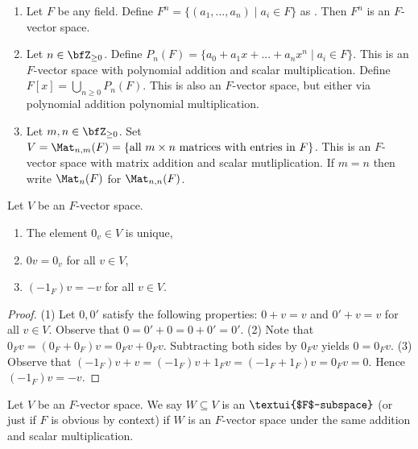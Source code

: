     \begin{example}
        \phantom{a}
        \begin{enumerate}[label = (\arabic*)]
            \item Let $F$ be any field. Define $F^n = \{(a_1,...,a_n) \mid a_i \in F\}$ as . Then $F^n$ is an $F$-vector space.
            \item Let $n \in \bfZ_{\geq 0}$. Define $P_n(F) = \{a_0 + a_1 x + ... + a_n x^n \mid a_i \in F\}$. This is an $F$-vector space with polynomial addition and scalar multiplication. Define $F[x] = \bigcup_{n \geq 0} P_n(F)$. This is also an $F$-vector space, but either via polynomial addition  polynomial multiplication.
            \item Let $m,n \in \bfZ_{\geq 0}$. Set $V = \Mat_{n,m}{(F)} = \{\text{all $m \times n$ matrices with entries in $F$}\}$. This is an $F$-vector space with matrix addition and scalar mutliplication. If $m = n$ then write $\Mat_{n}{(F)}$ for $\Mat_{n,n}{(F)}$.
        \end{enumerate}
    \end{example}

    \begin{lemma}
        Let $V$ be an $F$-vector space.
        \begin{enumerate}
            \item The element $0_v \in V$ is unique,
            \item $0v = 0_v$ for all $v \in V$,
            \item $(-1_F)v = -v$ for all $v \in V$.
        \end{enumerate}
    \end{lemma}
        \begin{proof}
            (1) Let $0,0'$ satisfy the following properties: $0+v = v$ and $0' + v = v$ for all $v \in V$. Observe that $0 = 0' + 0 = 0 + 0' = 0'$. (2) Note that $0_F v = (0_F + 0_F)v = 0_F v + 0_F v$. Subtracting both sides by $0_F v$ yields $0 = 0_F v$. (3) Observe that $(-1_F)v + v = (-1_F)v + 1_F v = (-1_F + 1_F)v = 0_F v = 0$. Hence $(-1_F)v = -v$.
        \end{proof}
    
    \begin{definition}
        Let $V$ be an $F$-vector space. We say $W \subseteq V$ is an $\textui{$F$-subspace}$ (or just  if $F$ is obvious by context) if $W$ is an $F$-vector space under the same addition and scalar multiplication.
    \end{definition}

